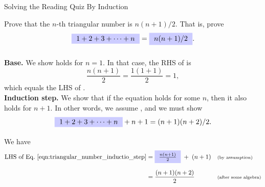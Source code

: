 \documentclass[10pt]{beamer}
\begin{document}
\begin{frame}{Solving the Reading Quiz By Induction}
\small
 \begin{mygreenbox}[title=Reading Quiz (Induction)]
Prove that the $n$-th triangular number is $n(n+1)/2$.  That is, prove 
%
\begin{equation}
\bluemathbox{1+ 2+ 3+ \cdots + n} = \bluemathbox{n(n+1)/2}.
\label{eqn:triangular_number_identity}
\end{equation}
\vspace{-0.6cm}
\end{mygreenbox}

\textbf{Base.} We show  holds for $n=1$.  In that case, the RHS of  is
\[ \frac{n(n+1)}{2} = \frac{1(1+1)}{2} = 1, \]
which equals the LHS of . \\

\textbf{Induction step.}  We show that if the equation holds for some $n$, then it also holds for $n+1$. In other words, we assume , and we must show
%
 \begin{equation}
\bluemathbox{1+ 2+ 3+ \cdots + n} + n+1 = (n+1)(n+2)/2.
\label{eqn:triangular_number_inductio_step}
\end{equation}
%
We have
%
\begin{align*}
 \text{LHS of \Eqref{eqn:triangular_number_inductio_step}} &= \bluemathbox{\frac{n(n+1)}{2}} \; + \; (n+1) && \scripttext{(by assumption)}\\
 &= \frac{(n+1)(n+2)}{2} && \scripttext{(after some algebra)}	
\end{align*}
\end{frame}
\end{document}
